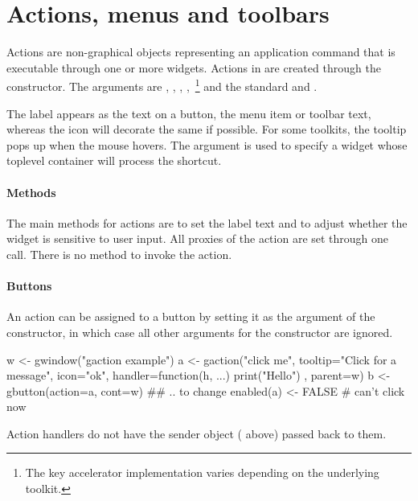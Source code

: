 \section{Actions, menus and toolbars}
\label{sec:gWidgets-acti-menus-toolb}


Actions are non-graphical objects representing an application command
that is executable through one or more widgets. Actions in
 are created through the 
constructor. The arguments are ,
, ,
,~\footnote{The key accelerator
  implementation varies depending on the underlying toolkit. }
 and the standard
 and . 

The label appears as the text on a button, the menu item or toolbar
text, whereas the icon will decorate the same if possible. For some
toolkits, the tooltip pops up when the mouse hovers. The  argument is used to
specify a widget whose toplevel container will process the shortcut.

\paragraph{Methods}
The main methods for actions are  to
set the label text and  to adjust
whether the widget is sensitive to user input. All proxies of the
action are set through one call. There is no method to invoke the action.

\paragraph{Buttons}
An action can be assigned to a button by setting it as the
 argument of the  constructor,
in which case all other arguments for the constructor are ignored.

\begin{Schunk}
\begin{Sinput}
 w <- gwindow("gaction example")
 a <- gaction("click me", tooltip="Click for a message", 
              icon="ok", 
              handler=function(h, ...) {
                print("Hello")
              },
              parent=w)
 b <- gbutton(action=a, cont=w)
 ## .. to change
 enabled(a) <- FALSE                     # can't click now
\end{Sinput}
\end{Schunk}
Action handlers do not have the sender object ( above)
passed back to them.

